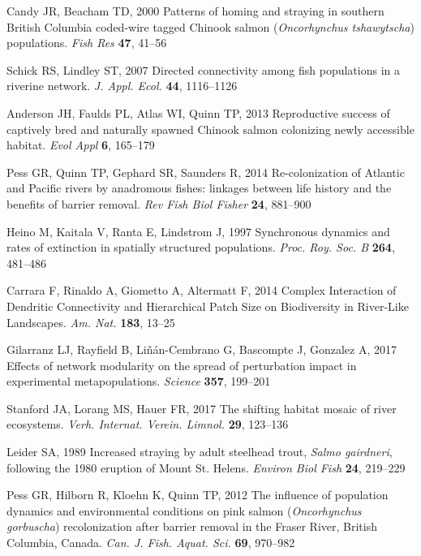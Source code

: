 \documentclass{revtex4}
\begin{document}
\begin{thebibliography}{10}
Candy JR, Beacham TD, 2000 {Patterns of homing and straying in southern British
  Columbia coded-wire tagged Chinook salmon (\emph{Oncorhynchus tshawytscha})
  populations}.
\newblock \emph{Fish Res} \textbf{47}, 41--56

Schick RS, Lindley ST, 2007 {Directed connectivity among fish populations in a
  riverine network}.
\newblock \emph{J. Appl. Ecol.} \textbf{44}, 1116--1126

Anderson JH, Faulds PL, Atlas WI, Quinn TP, 2013 {Reproductive success of
  captively bred and naturally spawned Chinook salmon colonizing newly
  accessible habitat}.
\newblock \emph{Evol Appl} \textbf{6}, 165--179

Pess GR, Quinn TP, Gephard SR, Saunders R, 2014 {Re-colonization of Atlantic
  and Pacific rivers by anadromous fishes: linkages between life history and
  the benefits of barrier removal}.
\newblock \emph{Rev Fish Biol Fisher} \textbf{24}, 881--900

Heino M, Kaitala V, Ranta E, Lindstrom J, 1997 {Synchronous dynamics and rates
  of extinction in spatially structured populations}.
\newblock \emph{Proc. Roy. Soc. B} \textbf{264}, 481--486

Carrara F, Rinaldo A, Giometto A, Altermatt F, 2014 {Complex Interaction of
  Dendritic Connectivity and Hierarchical Patch Size on Biodiversity in
  River-Like Landscapes}.
\newblock \emph{Am. Nat.} \textbf{183}, 13--25

Gilarranz LJ, Rayfield B, Li{\~n}{\'a}n-Cembrano G, Bascompte J, Gonzalez A,
  2017 {Effects of network modularity on the spread of perturbation impact in
  experimental metapopulations}.
\newblock \emph{Science} \textbf{357}, 199--201

Stanford JA, Lorang MS, Hauer FR, 2017 {The shifting habitat mosaic of river
  ecosystems}.
\newblock \emph{Verh. Internat. Verein. Limnol.} \textbf{29}, 123--136

Leider SA, 1989 {Increased straying by adult steelhead trout, \emph{Salmo
  gairdneri}, following the 1980 eruption of Mount St. Helens}.
\newblock \emph{Environ Biol Fish} \textbf{24}, 219--229

Pess GR, Hilborn R, Kloehn K, Quinn TP, 2012 {The influence of population
  dynamics and environmental conditions on pink salmon (\emph{Oncorhynchus
  gorbuscha}) recolonization after barrier removal in the Fraser River, British
  Columbia, Canada}.
\newblock \emph{Can. J. Fish. Aquat. Sci.} \textbf{69}, 970--982


\end{thebibliography}
\end{document}
